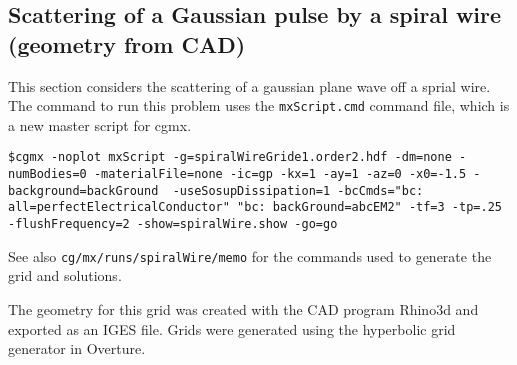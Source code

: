 \clearpage
\subsection{Scattering of a Gaussian pulse by a spiral wire (geometry from CAD)} \label{sec:scatSpiralWire}

This section considers the scattering of a gaussian plane wave off a sprial wire. 
The command to run this problem uses the \texttt{mxScript.cmd} command file, which is a new master script for cgmx.
\begin{lstlisting}
$cgmx -noplot mxScript -g=spiralWireGride1.order2.hdf -dm=none -numBodies=0 -materialFile=none -ic=gp -kx=1 -ay=1 -az=0 -x0=-1.5 -background=backGround  -useSosupDissipation=1 -bcCmds="bc: all=perfectElectricalConductor" "bc: backGround=abcEM2" -tf=3 -tp=.25 -flushFrequency=2 -show=spiralWire.show -go=go
\end{lstlisting}
See also \texttt{cg/mx/runs/spiralWire/memo}
for the commands used to generate the grid and solutions.

\bigskip\noindent
The geometry for this grid was created with the CAD program Rhino3d and exported as an IGES file. Grids were generated
using the hyperbolic grid generator in Overture.






